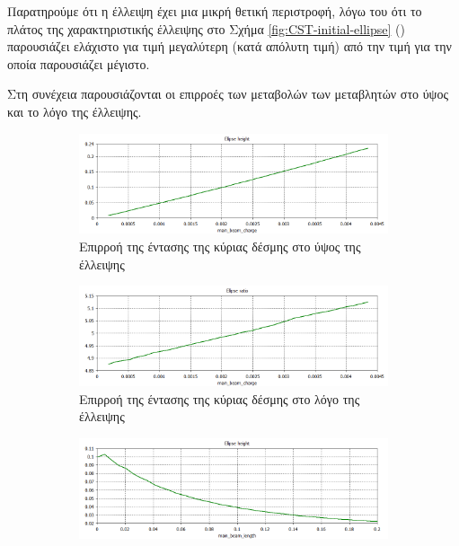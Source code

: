Παρατηρούμε ότι η έλλειψη έχει μια μικρή θετική περιστροφή, λόγω του ότι το πλάτος της χαρακτηριστικής έλλειψης στο Σχήμα \ref{fig:CST-initial-ellipse} () παρουσιάζει ελάχιστο για τιμή μεγαλύτερη (κατά απόλυτη τιμή) από την τιμή για την οποία παρουσιάζει μέγιστο.

Στη συνέχεια παρουσιάζονται οι επιρροές των μεταβολών των μεταβλητών στο ύψος και το λόγο της έλλειψης.

\begin{figure}[tph]	
	\centering
	\begin{subfigure}{0.47\textwidth}
		\includegraphics[width=\linewidth]{figures/CST-variable-analysis/CST-ellipse-height-by-bunch-intensity}
		\centering
		\caption{Επιρροή της έντασης της κύριας δέσμης στο ύψος της έλλειψης}
		\label{fig:CST-ellipse-height-by-bunch-intensity}
	\end{subfigure}
	\hfill
	\begin{subfigure}{0.47\textwidth}
		\includegraphics[width=\linewidth]{figures/CST-variable-analysis/CST-ellipse-ratio-by-bunch-intensity}
		\centering
		\caption{Επιρροή της έντασης της κύριας δέσμης στο λόγο της έλλειψης}
		\label{fig:CST-ellipse-ratio-by-bunch-intensity}
	\end{subfigure}	
	\par\bigskip	
	\begin{subfigure}{0.47\textwidth}
		\includegraphics[width=\linewidth]{figures/CST-variable-analysis/CST-ellipse-height-by-bunch-length}

\end{subfigure}
\end{figure}
